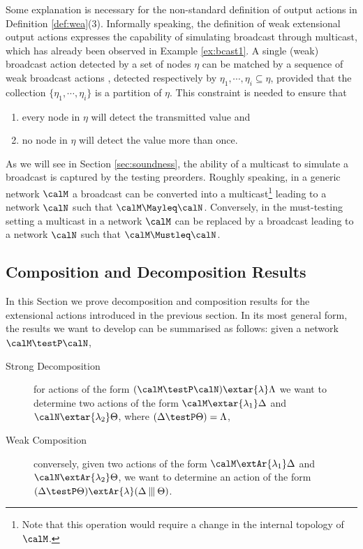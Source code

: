\documentclass{LMCS}
\begin{document}
Some explanation is necessary for the non-standard definition of
output actions in Definition \ref{def:wea}(3).  Informally speaking, the definition of
weak extensional output actions expresses the capability of simulating
broadcast through multicast, which has already been observed 
in Example \ref{ex:bcast1}. A single (weak) broadcast action
detected by a set of nodes $\eta$ can be matched by a sequence of weak
broadcast actions , detected
respectively by $\eta_1, \cdots, \eta_i \subseteq \eta$, provided that
the collection $\{\eta_1,\cdots,\eta_i\}$ is a partition of
$\eta$. This constraint is needed to ensure that
\begin{enumerate}[label=(\roman*)]
\item every node in $\eta$ will detect the transmitted value and
\item no node in $\eta$ will detect the value more than once.
\end{enumerate}
As we will see in Section \ref{sec:soundness}, the ability of a multicast to 
simulate a broadcast is captured by the testing preorders. Roughly speaking, 
in a generic network $\calM$ a broadcast can be converted into a multicast\footnote{
Note that this operation would require a change in the internal topology of $\calM$.} 
leading to a network $\calN$ such that $\calM \Mayleq \calN$. 
Conversely, in the must-testing setting a multicast in a network $\calM$ 
can be replaced by a broadcast leading to a network $\calN$ such that 
$\calM \Mustleq \calN$.



\subsection{Composition and Decomposition Results}
\label{sec:comp.decomp}
In this Section we prove decomposition and composition results for 
the extensional actions introduced in the previous section. 
In its most general form, the results we want to develop can be 
summarised as follows: given a network $\calM \testP \calN$, 
\begin{description}
\item[Strong Decomposition] for actions of the form $(\calM \testP \calN) \extar{\lambda} \Lambda$ 
we want to determine two actions of the form $\calM \extar{\lambda_1} \Delta$ and 
$\calN \extar{\lambda_2} \Theta$, where $(\Delta \testP \Theta) = \Lambda$,
\item[Weak Composition] conversely, given two actions of the form 
$\calM \extAr{\lambda_1} \Delta$ and $\calN \extAr{\lambda_2} \Theta$, 
we want to determine an action of the form $(\Delta \testP \Theta) 
\extAr{\lambda} (\Delta \interleave \Theta)$.
\end{description}\smallskip
\end{document}
